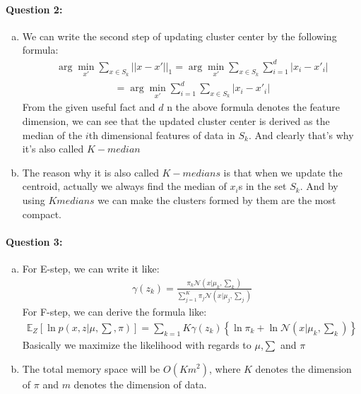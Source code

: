 \documentclass[letterpaper,11pt]{article}
\begin{document}
\paragraph{Question 2:}
\begin{enumerate}[(a)]
\item
We can write the second step of updating cluster center by the following formula:
\begin{eqnarray}
\arg\min_{x'}{\sum_{x\in S_k}{||x-x'||_1}}=\arg\min_{x'}{\sum_{x\in S_k}{\sum_{i=1}^d{|x_i-x'_i|}}}
\end{eqnarray}
\begin{eqnarray}
= \arg\min_{x'}{\sum_{i=1}^d{\sum_{x\in S_k}}{|x_i-x'_i|}}
\end{eqnarray}
From the given useful fact and $d$ n the above formula denotes the feature dimension, we can see that the updated cluster center is derived as the median of the $i$th dimensional features of data in $S_k$. And clearly that's why it's also called $K-median$
\item
The reason why it is also called $K-medians$ is that when we update the centroid, actually we always find the median of $x_i$s in the set $S_k$. And by using $K medians$ we can make the clusters formed by them are the most compact.
\end{enumerate}

\paragraph{Question 3:}
\begin{enumerate}[(a)]
\item
For E-step, we can write it like:
\begin{eqnarray}
\gamma(z_k)=\frac{\pi_k\mathcal{N}(x|\mu_k,\sum_{k})}{\sum_{j=1}^K{\pi_j}\mathcal{N}(x|\mu_j,\sum_{j})}
\end{eqnarray}
For F-step, we can derive the formula like:
\begin{eqnarray}
\mathds{E}_Z[\ln{p(x,z|\mu,\sum,\pi)}]= \sum_{k=1}{K}\gamma(z_k)\left\{\ln \pi_k + \ln \mathcal{N}(x|\mu_k,\sum_{k})\right\}
\end{eqnarray}
Basically we maximize the likelihood with regards to $\mu$,$\sum$ and $\pi$

\item
The total memory space will be $O(Km^2)$, where $K$ denotes the dimension of $\pi$ and $m$ denotes the dimension of data.
\end{enumerate}
\end{document}
